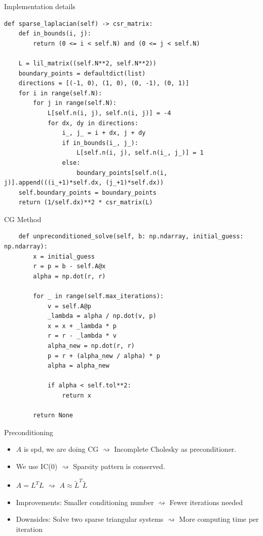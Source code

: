 \documentclass[11pt,aspectratio=1610]{beamer}
\begin{document}
\begin{frame}[fragile]{Implementation details}
\footnotesize
\begin{verbatim}
def sparse_laplacian(self) -> csr_matrix:
    def in_bounds(i, j): 
        return (0 <= i < self.N) and (0 <= j < self.N)
    
    L = lil_matrix((self.N**2, self.N**2)) 
    boundary_points = defaultdict(list) 
    directions = [(-1, 0), (1, 0), (0, -1), (0, 1)]
    for i in range(self.N):
        for j in range(self.N):
            L[self.n(i, j), self.n(i, j)] = -4 
            for dx, dy in directions:
                i_, j_ = i + dx, j + dy
                if in_bounds(i_, j_):
                    L[self.n(i, j), self.n(i_, j_)] = 1
                else:
                    boundary_points[self.n(i, j)].append(((i_+1)*self.dx, (j_+1)*self.dx)) 
    self.boundary_points = boundary_points
    return (1/self.dx)**2 * csr_matrix(L) 
\end{verbatim}
\end{frame}

\begin{frame}[fragile]{CG Method}
\footnotesize
\begin{verbatim}
    def unpreconditioned_solve(self, b: np.ndarray, initial_guess: np.ndarray):
    	x = initial_guess
        r = p = b - self.A@x 
        alpha = np.dot(r, r) 

        for _ in range(self.max_iterations):
            v = self.A@p 
            _lambda = alpha / np.dot(v, p)
            x = x + _lambda * p
            r = r - _lambda * v
            alpha_new = np.dot(r, r)
            p = r + (alpha_new / alpha) * p
            alpha = alpha_new

            if alpha < self.tol**2:
                return x
            
        return None
\end{verbatim}
\end{frame}

\begin{frame}
\end{frame}


\begin{frame}{Preconditioning}
\begin{itemize}
    \item $A$ is spd, we are doing CG $\rightsquigarrow$ Incomplete Cholesky as preconditioner.
    \item We use IC(0) $\rightsquigarrow$ Sparsity pattern is conserved.
    \item $A = L^TL$ $\rightsquigarrow$ $A \approx \tilde{L}^T\tilde{L}$
    \item Improvements: Smaller conditioning number $\rightsquigarrow$ Fewer iterations needed
    \item Downsides: Solve two sparse triangular systems $\rightsquigarrow$ More computing time per iteration
\end{itemize}



\end{frame}
\end{document}
